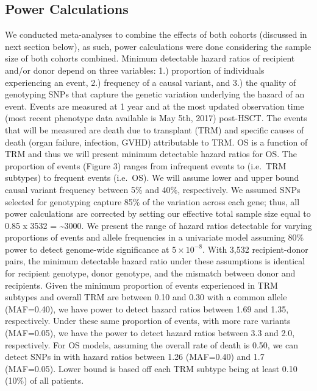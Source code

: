 \documentclass[]{DissertateOSU}
\begin{document}
\subsection{Power Calculations}\label{power-calculations}

We conducted meta-analyses to combine the effects of both cohorts
(discussed in next section below), as such, power calculations were done
considering the sample size of both cohorts combined. Minimum detectable
hazard ratios of recipient and/or donor depend on three variables: 1.)
proportion of individuals experiencing an event, 2.) frequency of a
causal variant, and 3.) the quality of genotyping SNPs that capture the
genetic variation underlying the hazard of an event. Events are measured
at 1 year and at the most updated observation time (most recent
phenotype data available is May 5th, 2017) post-HSCT. The events that
will be measured are death due to transplant (TRM) and specific causes
of death (organ failure, infection, GVHD) attributable to TRM. OS is a
function of TRM and thus we will present minimum detectable hazard
ratios for OS. The proportion of events (Figure 3) ranges from
infrequent events to (i.e.~TRM subtypes) to frequent events (i.e.~OS).
We will assume lower and upper bound causal variant frequency between
5\% and 40\%, respectively. We assumed SNPs selected for genotyping
capture 85\% of the variation across each gene; thus, all power
calculations are corrected by setting our effective total sample size
equal to 0.85 x 3532 = \textasciitilde{}3000. We present the range of
hazard ratios detectable for varying proportions of events and allele
frequencies in a univariate model assuming 80\% power to detect
genome-wide significance at \(5\times{10}^{-8}\). With 3,532
recipient-donor pairs, the minimum detectable hazard ratio under these
assumptions is identical for recipient genotype, donor genotype, and the
mismatch between donor and recipients. Given the minimum proportion of
events experienced in TRM subtypes and overall TRM are between 0.10 and
0.30 with a common allele (MAF=0.40), we have power to detect hazard
ratios between 1.69 and 1.35, respectively. Under these same proportion
of events, with more rare variants (MAF=0.05), we have the power to
detect hazard ratios between 3.3 and 2.0, respectively. For OS models,
assuming the overall rate of death is 0.50, we can detect SNPs in with
hazard ratios between 1.26 (MAF=0.40) and 1.7 (MAF=0.05). Lower bound is
based off each TRM subtype being at least 0.10 (10\%) of all patients.
\end{document}
